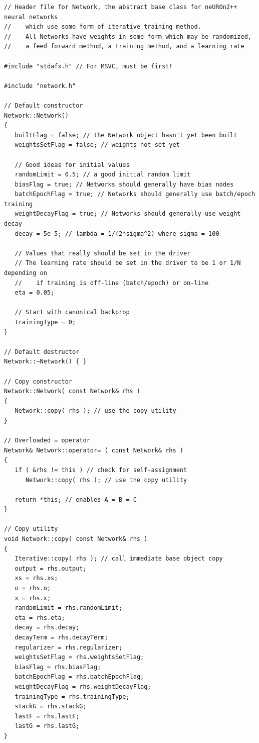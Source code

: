 \documentclass{report}[10pt]
\begin{document}
\scriptsize
\begin{verbatim}
// Header file for Network, the abstract base class for neUROn2++ neural networks
//    which use some form of iterative training method.
//    All Networks have weights in some form which may be randomized,
//    a feed forward method, a training method, and a learning rate

#include "stdafx.h" // For MSVC, must be first!

#include "network.h"

// Default constructor
Network::Network()
{
   builtFlag = false; // the Network object hasn't yet been built
   weightsSetFlag = false; // weights not set yet

   // Good ideas for initial values
   randomLimit = 0.5; // a good initial random limit   
   biasFlag = true; // Networks should generally have bias nodes
   batchEpochFlag = true; // Networks should generally use batch/epoch training
   weightDecayFlag = true; // Networks should generally use weight decay
   decay = 5e-5; // lambda = 1/(2*sigma^2) where sigma = 100

   // Values that really should be set in the driver
   // The learning rate should be set in the driver to be 1 or 1/N depending on
   //    if training is off-line (batch/epoch) or on-line
   eta = 0.05;

   // Start with canonical backprop
   trainingType = 0;
}

// Default destructor
Network::~Network() { }

// Copy constructor
Network::Network( const Network& rhs )
{
   Network::copy( rhs ); // use the copy utility
}

// Overloaded = operator
Network& Network::operator= ( const Network& rhs )
{
   if ( &rhs != this ) // check for self-assignment
      Network::copy( rhs ); // use the copy utility
   
   return *this; // enables A = B = C
}

// Copy utility
void Network::copy( const Network& rhs )
{
   Iterative::copy( rhs ); // call immediate base object copy
   output = rhs.output;
   xs = rhs.xs;
   o = rhs.o;
   x = rhs.x;
   randomLimit = rhs.randomLimit;
   eta = rhs.eta;
   decay = rhs.decay;
   decayTerm = rhs.decayTerm;
   regularizer = rhs.regularizer;
   weightsSetFlag = rhs.weightsSetFlag;
   biasFlag = rhs.biasFlag;
   batchEpochFlag = rhs.batchEpochFlag;
   weightDecayFlag = rhs.weightDecayFlag;
   trainingType = rhs.trainingType;
   stackG = rhs.stackG;
   lastF = rhs.lastF;
   lastG = rhs.lastG;
}


\end{verbatim}
\end{document}
